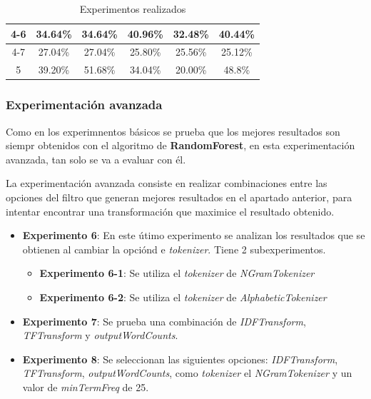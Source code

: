 \documentclass[12pt,a4paper, xcolor=table]{article}
\begin{document}
\begin{table}[h]
\begin{tabular}{|c|c|c|c|c|c|}
            4-6                     & 34.64\%                   & 34.64\%        & 40.96\%                    & 32.48\%         & 40.44\%            \\ \hline
            4-7                     & 27.04\%                   & 27.04\%        & 25.80\%                    & 25.56\%         & 25.12\%            \\ \hline
            5                       & 39.20\%                   & 51.68\%        & 34.04\%                    & 20.00\%         & 48.8\%            \\ \hline
            \end{tabular}
            \caption{Experimentos realizados}
                \label{fig:graf_exp1}
        \end{table}


        \subsubsection{Experimentación avanzada}

        Como en los experimnentos básicos se prueba que los mejores resultados son siempr obtenidos con el algoritmo de \textbf{RandomForest}, en esta experimentación avanzada, tan solo se va a evaluar con él.

        \vspace{3mm}

        La experimentación avanzada consiste en realizar combinaciones entre las opciones del filtro que generan mejores resultados en el apartado anterior, para intentar encontrar una transformación que maximice el resultado obtenido.

        \begin{itemize}
          \item \textbf{Experimento 6}: En este útimo experimento se analizan los resultados que se obtienen al cambiar la opciónd e \textit{tokenizer}. Tiene 2 subexperimentos.
          \begin{itemize}
            \item \textbf{Experimento 6-1}: Se utiliza el \textit{tokenizer} de \textit{NGramTokenizer}
            \item \textbf{Experimento 6-2}: Se utiliza el \textit{tokenizer} de \textit{AlphabeticTokenizer}
          \end{itemize}
          \item \textbf{Experimento 7}: Se prueba una combinación de \textit{IDFTransform}, \textit{TFTransform} y \textit{outputWordCounts}.
          \item \textbf{Experimento 8}: Se seleccionan las siguientes opciones: \textit{IDFTransform}, \textit{TFTransform}, \textit{outputWordCounts}, como \textit{tokenizer} el \textit{NGramTokenizer} y un valor de \textit{minTermFreq} de 25.
        \end{itemize}
\end{document}
